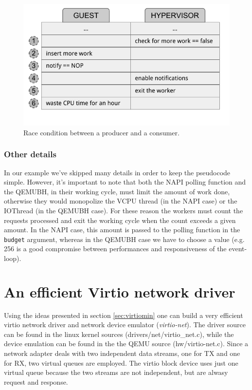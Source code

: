 \begin{figure}[bt]
\centering
\includegraphics[scale = 1.0]{race.pdf}
\caption{Race condition between a producer and a consumer.}
\label{fig:race}
\end{figure}


\subsubsection{Other details}
In our example we've skipped many details in order to keep the pseudocode simple. However, it's important to note that both the NAPI
polling function and the QEMUBH, in their working cycle, must limit the amount of work done, otherwise they would monopolize the VCPU
thread (in the NAPI case) or the IOThread (in the QEMUBH case). For these reason the workers must count the requests processed and
exit the working cycle when the count exceeds a given amount. In the NAPI case, this amount is passed to the polling function in the
\texttt{budget} argument, whereas in the QEMUBH case we have to choose a value (e.g. 256 is a good compromise between performances and
responsiveness of the event-loop).



\section{An efficient Virtio network driver}
\label{sec:virtionet}
Using the ideas presented in section \ref{sec:virtiomin} one can build a very efficient virtio network driver and network device emulator 
(\emph{virtio-net}). The driver source can be found in the linux kernel sources (drivers/net/virtio\_net.c), while the device
emulation can be found in the the QEMU source (hw/virtio-net.c).
Since a network adapter deals with two independent data streams, one for TX and one for RX, two virtual queues are employed. The virtio
block device uses just one virtual queue because the two streams are not independent, but are alwasy request and response.


